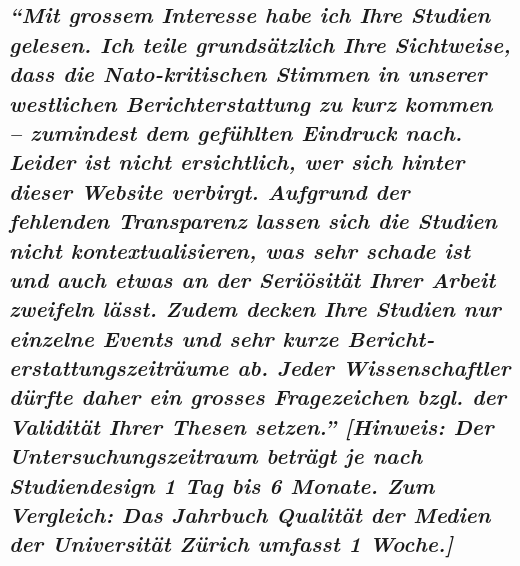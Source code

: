 {\subsection{\texorpdfstring{\emph{``Mit grossem Interesse habe ich Ihre
Studien gelesen. Ich teile grundsätzlich Ihre Sichtweise, dass die
Nato-kri­ti­schen Stimmen in unserer westlichen Bericht­erstattung zu
kurz kommen -- zumindest dem gefühlten Eindruck nach. Leider ist nicht
ersichtlich, wer sich hinter dieser Website verbirgt. Aufgrund der
fehlenden Trans­pa­renz lassen sich die Studien nicht
kontex­tu­ali­sieren, was sehr schade ist und auch etwas an der
Seriösität Ihrer Arbeit zweifeln lässt. Zudem decken Ihre Studien nur
einzelne Events und sehr kurze Bericht­erstattungs­zeiträume ab. Jeder
Wissen­schaftler dürfte daher ein grosses Fragezeichen bzgl. der
Validität Ihrer Thesen setzen.'' {[}Hinweis: Der
Unter­suchungs­­zeitraum beträgt je nach Studiendesign 1 Tag bis 6
Monate. Zum Vergleich: Das Jahrbuch Qualität der Medien der Universität
Zürich umfasst 1
Woche.{]}}}{``Mit grossem Interesse habe ich Ihre Studien gelesen. Ich teile grundsätzlich Ihre Sichtweise, dass die Nato-kri­ti­schen Stimmen in unserer westlichen Bericht­erstattung zu kurz kommen -- zumindest dem gefühlten Eindruck nach. Leider ist nicht ersichtlich, wer sich hinter dieser Website verbirgt. Aufgrund der fehlenden Trans­pa­renz lassen sich die Studien nicht kontex­tu­ali­sieren, was sehr schade ist und auch etwas an der Seriösität Ihrer Arbeit zweifeln lässt. Zudem decken Ihre Studien nur einzelne Events und sehr kurze Bericht­erstattungs­zeiträume ab. Jeder Wissen­schaftler dürfte daher ein grosses Fragezeichen bzgl. der Validität Ihrer Thesen setzen.'' {[}Hinweis: Der Unter­suchungs­­zeitraum beträgt je nach Studiendesign 1 Tag bis 6 Monate. Zum Vergleich: Das Jahrbuch Qualität der Medien der Universität Zürich umfasst 1 Woche.{]}}}\label{mit-grossem-interesse-habe-ich-ihre-studien-gelesen-ich-teile-grundsuxe4tzlich-ihre-sichtweise-dass-die-nato-kritischen-stimmen-in-unserer-westlichen-berichterstattung-zu-kurz-kommen--zumindest-dem-gefuxfchlten-eindruck-nach-leider-ist-nicht-ersichtlich-wer-sich-hinter-dieser-website-verbirgt-aufgrund-der-fehlenden-transparenz-lassen-sich-die-studien-nicht-kontextualisieren-was-sehr-schade-ist-und-auch-etwas-an-der-seriuxf6situxe4t-ihrer-arbeit-zweifeln-luxe4sst-zudem-decken-ihre-studien-nur-einzelne-events-und-sehr-kurze-berichterstattungszeitruxe4ume-ab-jeder-wissenschaftler-duxfcrfte-daher-ein-grosses-fragezeichen-bzgl-der-validituxe4t-ihrer-thesen-setzen-hinweis-der-untersuchungszeitraum-betruxe4gt-je-nach-studiendesign-1-tag-bis-6-monate-zum-vergleich-das-jahrbuch-qualituxe4t-der-medien-der-universituxe4t-zuxfcrich-umfasst-1-woche}}

